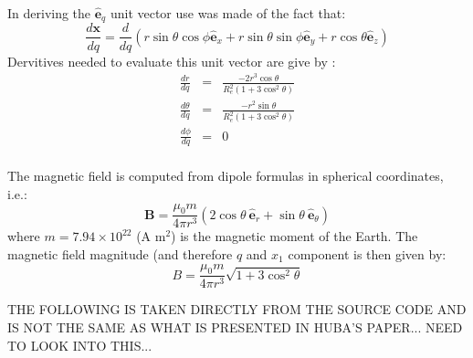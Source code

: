 \documentclass[11pt,letterpaper]{article}
\begin{document}
In deriving the $\hat{\mathbf{e}}_q$ unit vector use was made of the fact that:
\begin{equation}  
\frac{d \mathbf{x}}{d q} = \frac{d}{d q} \left( r \sin \theta \cos \phi \hat{\mathbf{e}}_x + r \sin \theta \sin \phi \hat{\mathbf{e}}_y + r \cos \theta \hat{\mathbf{e}}_z \right)
\end{equation}
Dervitives needed to evaluate this unit vector are give by \citet{Schunk:2009}:  
\begin{eqnarray}
\frac{d r}{d q} &=& \frac{-2 r^3 \cos \theta}{R_e^2 \left( 1 + 3 \cos^2 \theta \right)}\\
\frac{d \theta}{d q} &=& \frac{-r^2 \sin \theta}{R_e^2 \left( 1 + 3 \cos^2 \theta \right)} \\
\frac{d \phi}{d q} &=& 0 \\
\end{eqnarray}

The magnetic field is computed from dipole formulas in spherical coordinates, i.e.:  
\begin{equation}
\mathbf{B}=\frac{\mu_0 m}{4 \pi r^3} \left(2 \cos \theta ~ \hat{\mathbf{e}}_r + \sin \theta ~ \hat{\mathbf{e}}_\theta \right)
\end{equation}
where $m=7.94 \times 10^{22}$ (A m$^2$) is the magnetic moment of the Earth.  The magnetic field magnitude (and therefore $q$ and $x_1$ component is then given by:  
\begin{equation}
B=\frac{\mu_0 m}{4 \pi r^3} \sqrt{1+3 \cos^2 \theta}
\end{equation}

THE FOLLOWING IS TAKEN DIRECTLY FROM THE SOURCE CODE AND IS NOT THE SAME AS WHAT IS PRESENTED IN HUBA'S PAPER...  NEED TO LOOK INTO THIS...
\end{document}
